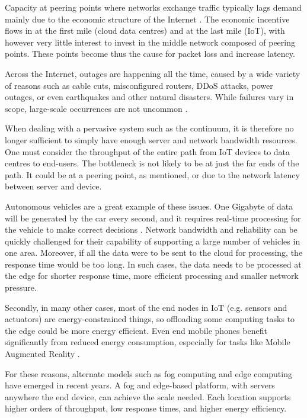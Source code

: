 \documentclass{ieeeaccess}
\begin{document}
Capacity at peering points where networks exchange traffic typically lags demand mainly due to the economic structure of the Internet \cite{akamai}. The economic incentive flows in at the first mile (cloud data centres) and at the last mile (IoT), with however very little interest to invest in the middle network composed of peering points. These points become thus the cause for packet loss and increase latency.

Across the Internet, outages are happening all the time, caused by a wide variety of reasons such as cable cuts, misconfigured routers, DDoS attacks, power outages, or even earthquakes and other natural disasters. While failures vary in scope, large-scale occurrences are not uncommon \cite{aws-outage}.

When dealing with a pervasive system such as the continuum, it is therefore no longer sufficient to simply have enough server and network bandwidth resources. One must consider the throughput of the entire path from IoT devices to data centres to end-users. The bottleneck is not likely to be at just the far ends of the path. It could be at a peering point, as mentioned, or due to the network latency between server and device. 

Autonomous vehicles are a great example of these issues. One Gigabyte of data will be generated by the car every second, and it requires real-time processing for the vehicle to make correct decisions \cite{edge-computing-vision-challenges}. Network bandwidth and reliability can be quickly challenged for their capability of supporting a large number of vehicles in one area. Moreover, if all the data were to be sent to the cloud for processing, the response time would be too long. In such cases, the data needs to be processed at the edge for shorter response time, more efficient processing and smaller network pressure.

Secondly, in many other cases, most of the end nodes in IoT (e.g. sensors and actuators) are energy-constrained things, so offloading some computing tasks to the edge could be more energy efficient. Even end mobile phones benefit significantly from reduced energy consumption, especially for tasks like Mobile Augmented Reality \cite{mobile-augmented-reality}.

For these reasons, alternate models such as fog computing and edge computing have emerged in recent years. A fog and edge-based platform, with servers anywhere the end device, can achieve the scale needed. Each location supports higher orders of throughput, low response times, and higher energy efficiency.
\end{document}
